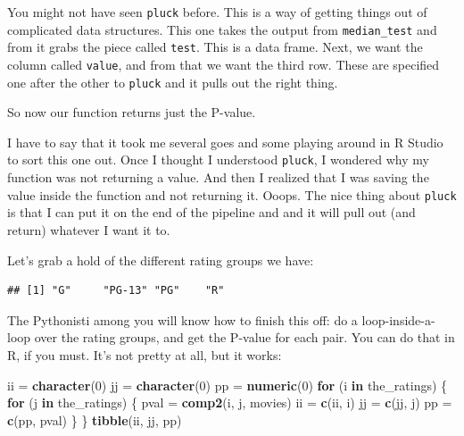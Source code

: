 \documentclass[]{tufte-book}
\newenvironment{Shaded}{}{}
\newcommand{\ControlFlowTok}[1]{\textcolor[rgb]{0.00,0.44,0.13}{\textbf{#1}}}
\newcommand{\DecValTok}[1]{\textcolor[rgb]{0.25,0.63,0.44}{#1}}
\newcommand{\KeywordTok}[1]{\textcolor[rgb]{0.00,0.44,0.13}{\textbf{#1}}}
\newcommand{\NormalTok}[1]{#1}
\newcommand{\OperatorTok}[1]{\textcolor[rgb]{0.40,0.40,0.40}{#1}}
\newcommand{\StringTok}[1]{\textcolor[rgb]{0.25,0.44,0.63}{#1}}
\theoremstyle{definition}
\theoremstyle{definition}
\theoremstyle{definition}
\theoremstyle{remark}
\begin{document}
You might not have seen \texttt{pluck} before. This is a way of getting
things out of complicated data structures. This one takes the output
from \texttt{median\_test} and from it grabs the piece called
\texttt{test}. This is a data frame. Next, we want the column called
\texttt{value}, and from that we want the third row. These are specified
one after the other to \texttt{pluck} and it pulls out the right thing.

So now our function returns just the P-value.

I have to say that it took me several goes and some playing around in R
Studio to sort this one out. Once I thought I understood \texttt{pluck},
I wondered why my function was not returning a value. And then I
realized that I was saving the value inside the function and not
returning it. Ooops. The nice thing about \texttt{pluck} is that I can
put it on the end of the pipeline and and it will pull out (and return)
whatever I want it to.

Let's grab a hold of the different rating groups we have:

\begin{Shaded}
\end{Shaded}

\begin{verbatim}
## [1] "G"     "PG-13" "PG"    "R"
\end{verbatim}

The Pythonisti among you will know how to finish this off: do a
loop-inside-a-loop over the rating groups, and get the P-value for each
pair. You can do that in R, if you must. It's not pretty at all, but it
works:

\begin{Shaded}
\begin{Highlighting}[]
\NormalTok{ii =}\StringTok{ }\KeywordTok{character}\NormalTok{(}\DecValTok{0}\NormalTok{)}
\NormalTok{jj =}\StringTok{ }\KeywordTok{character}\NormalTok{(}\DecValTok{0}\NormalTok{)}
\NormalTok{pp =}\StringTok{ }\KeywordTok{numeric}\NormalTok{(}\DecValTok{0}\NormalTok{)}
\ControlFlowTok{for}\NormalTok{ (i }\ControlFlowTok{in}\NormalTok{ the_ratings) \{}
    \ControlFlowTok{for}\NormalTok{ (j }\ControlFlowTok{in}\NormalTok{ the_ratings) \{}
\NormalTok{        pval =}\StringTok{ }\KeywordTok{comp2}\NormalTok{(i, j, movies)}
\NormalTok{        ii =}\StringTok{ }\KeywordTok{c}\NormalTok{(ii, i)}
\NormalTok{        jj =}\StringTok{ }\KeywordTok{c}\NormalTok{(jj, j)}
\NormalTok{        pp =}\StringTok{ }\KeywordTok{c}\NormalTok{(pp, pval)}
\NormalTok{    \}}
\NormalTok{\}}
\KeywordTok{tibble}\NormalTok{(ii, jj, pp)}
\end{Highlighting}
\end{Shaded}
\end{document}
